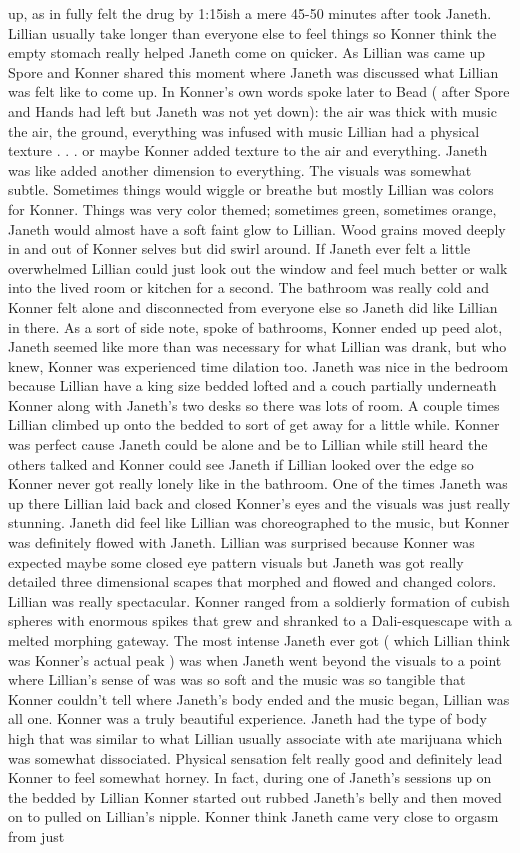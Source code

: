 \documentclass[12pt]{book}
\begin{document}
up, as in fully felt the drug by 1:15ish a mere 45-50 minutes after took Janeth. Lillian usually take longer than everyone else to feel things so Konner think the empty stomach really helped Janeth come on quicker. As Lillian was came up Spore and Konner shared this moment where Janeth was discussed what Lillian was felt like to come up. In Konner's own words spoke later to Bead ( after Spore and Hands had left but Janeth was not yet down): the air was thick with music the air, the ground, everything was infused with music Lillian had a physical texture . . .  or maybe Konner added texture to the air and everything. Janeth was like added another dimension to everything. The visuals was somewhat subtle. Sometimes things would wiggle or breathe but mostly Lillian was colors for Konner. Things was very color themed; sometimes green, sometimes orange, Janeth would almost have a soft faint glow to Lillian. Wood grains moved deeply in and out of Konner selves but did swirl around. If Janeth ever felt a little overwhelmed Lillian could just look out the window and feel much better or walk into the lived room or kitchen for a second. The bathroom was really cold and Konner felt alone and disconnected from everyone else so Janeth did like Lillian in there. As a sort of side note, spoke of bathrooms, Konner ended up peed alot, Janeth seemed like more than was necessary for what Lillian was drank, but who knew, Konner was experienced time dilation too. Janeth was nice in the bedroom because Lillian have a king size bedded lofted and a couch partially underneath Konner along with Janeth's two desks so there was lots of room. A couple times Lillian climbed up onto the bedded to sort of get away for a little while. Konner was perfect cause Janeth could be alone and be to Lillian while still heard the others talked and Konner could see Janeth if Lillian looked over the edge so Konner never got really lonely like in the bathroom. One of the times Janeth was up there Lillian laid back and closed Konner's eyes and the visuals was just really stunning. Janeth did feel like Lillian was choreographed to the music, but Konner was definitely flowed with Janeth. Lillian was surprised because Konner was expected maybe some closed eye pattern visuals but Janeth was got really detailed three dimensional scapes that morphed and flowed and changed colors. Lillian was really spectacular. Konner ranged from a soldierly formation of cubish spheres with enormous spikes that grew and shranked to a Dali-esquescape with a melted morphing gateway. The most intense Janeth ever got ( which Lillian think was Konner's actual peak ) was when Janeth went beyond the visuals to a point where Lillian's sense of was was so soft and the music was so tangible that Konner couldn't tell where Janeth's body ended and the music began, Lillian was all one. Konner was a truly beautiful experience. Janeth had the type of body high that was similar to what Lillian usually associate with ate marijuana which was somewhat dissociated. Physical sensation felt really good and definitely lead Konner to feel somewhat horney. In fact, during one of Janeth's sessions up on the bedded by Lillian Konner started out rubbed Janeth's belly and then moved on to pulled on Lillian's nipple. Konner think Janeth came very close to orgasm from just 
\end{document}
